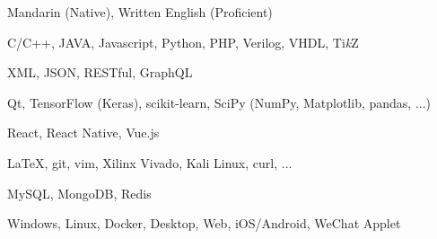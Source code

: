 
\begin{cvtbl}
        {Mandarin (Native), Written English (Proficient)}%

        {C/C++, JAVA, Javascript, Python, PHP, Verilog, VHDL, Ti\textit{k}Z}

        {XML, JSON, RESTful, GraphQL}

        {Qt, TensorFlow (Keras), scikit-learn, SciPy (NumPy, Matplotlib, pandas, ...)}

        {React, React Native, Vue.js}

        {\LaTeX, git, vim, Xilinx Vivado, Kali Linux, curl, ...}

        {MySQL, MongoDB, Redis}

        {Windows, Linux, Docker, Desktop, Web, iOS/Android, WeChat Applet}
\end{cvtbl}

\endinput